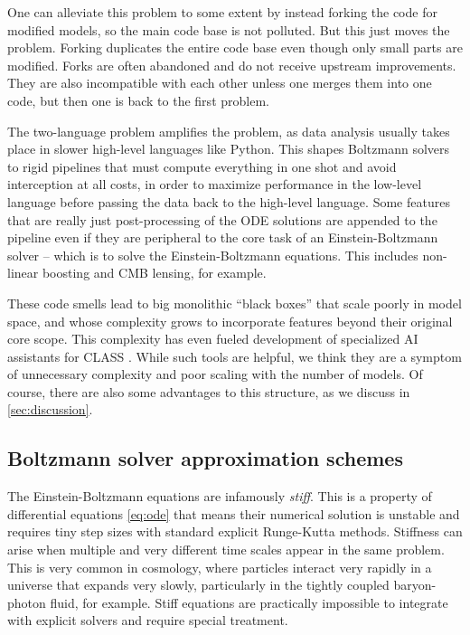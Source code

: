 \documentclass{aa}
\begin{document}
One can alleviate this problem to some extent by instead forking the code for modified models, so the main code base is not polluted.
But this just moves the problem.
Forking duplicates the entire code base even though only small parts are modified.
Forks are often abandoned and do not receive upstream improvements.
They are also incompatible with each other unless one merges them into one code, but then one is back to the first problem.

The two-language problem amplifies the problem, as data analysis usually takes place in slower high-level languages like Python.
This shapes Boltzmann solvers to rigid pipelines that must compute everything in one shot and avoid interception at all costs, in order to maximize performance in the low-level language before passing the data back to the high-level language.
Some features that are really just post-processing of the ODE solutions are appended to the pipeline even if they are peripheral to the core task of an Einstein-Boltzmann solver -- which is to solve the Einstein-Boltzmann equations.
This includes non-linear boosting and CMB lensing, for example.

These code smells lead to big monolithic \enquote{black boxes} that scale poorly in model space, and whose complexity grows to incorporate features beyond their original core scope.
This complexity has even fueled development of specialized AI assistants for CLASS \citep{casasCLAPPCLASSLLM2025}.
While such tools are helpful, we think they are a symptom of unnecessary complexity and poor scaling with the number of models.
Of course, there are also some advantages to this structure, as we discuss in \cref{sec:discussion}.

\subsection{Boltzmann solver approximation schemes}
\label{sec:intro_approximations}

The Einstein-Boltzmann equations are infamously \emph{stiff}.
This is a property of differential equations \eqref{eq:ode} that means their numerical solution is unstable and requires tiny step sizes with standard explicit Runge-Kutta methods.
Stiffness can arise when multiple and very different time scales appear in the same problem.
This is very common in cosmology, where particles interact very rapidly in a universe that expands very slowly, particularly in the tightly coupled baryon-photon fluid, for example.
Stiff equations are practically impossible to integrate with explicit solvers and require special treatment.
\end{document}
